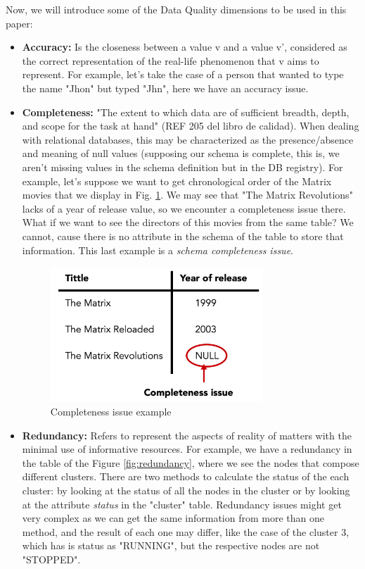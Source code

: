 \documentclass[%
 reprint,
 amsmath,amssymb,
 aps,
]{revtex4-1}
\begin{document}
Now, we will introduce some of the Data Quality dimensions to be used in this paper:

\begin{itemize}
  \item \textbf{Accuracy:} Is the closeness between a value v and a value v', considered as the correct representation of the real-life phenomenon that v aims to represent. For example, let's take the case of a person that wanted to type the name "Jhon" but typed "Jhn", here we have an accuracy issue.
  \item \textbf{Completeness:} "The extent to which data are of sufficient breadth, depth, and scope for the task at hand" (REF 205 del libro de calidad). When dealing with relational databases, this may be characterized as the presence/absence and meaning of null values (supposing our schema is complete, this is, we aren't missing values in the schema definition but in the DB registry). For example, let's suppose we want to get chronological order of the Matrix movies that we display in Fig. \ref{fig:completeness}. We may see that "The Matrix Revolutions" lacks of a year of release value, so we encounter a completeness issue there. What if we want to see the directors of this movies from the same table? We cannot, cause there is no attribute in the schema of the table to store that information. This last example is a \emph{schema completeness issue}.
  
  \begin{figure}[h]
    \includegraphics[width=8cm]{movies_table.png}
    \centering
    \caption{Completeness issue example}
    \label{fig:completeness}
  \end{figure}
  
  \item \textbf{Redundancy:} Refers to represent the aspects of reality of matters with the minimal use of informative resources. For example, we have a redundancy in the table of the Figure \ref{fig:redundancy}, where we see the nodes that compose different clusters. There are two methods to calculate the status of the each cluster: by looking at the status of all the nodes in the cluster or by looking at the attribute \emph{status} in the "cluster" table. Redundancy issues might get very complex as we can get the same information from more than one method, and the result of each one may differ, like the case of the cluster 3, which has is status as "RUNNING", but the respective nodes are not "STOPPED".
  

\end{itemize}
\end{document}
